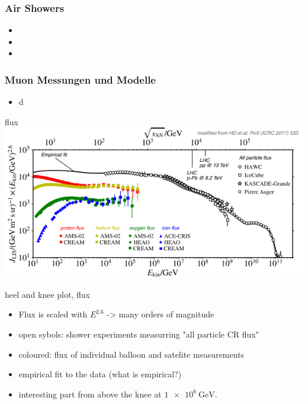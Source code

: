 \documentclass[aspectratio=1610, 9pt]{beamer}
\begin{document}
\begin{frame}\frametitle{Air Showers}
  \begin{itemize}
    \item
    \item
    \item
  \end{itemize}
\end{frame}

\begin{frame}\frametitle{Muon Messungen und Modelle}
  \begin{itemize}
    \item d
  \end{itemize}
\end{frame}

\begin{frame}{flux}
  \includegraphics[width=\textwidth]{knee_heel.png}
\end{frame}

\begin{frame}{heel and knee plot, flux}
  \begin{itemize}
    \item Flux is scaled with $E^{2.6}$ -> many orders of magnitude
    \item open sybols: shower experiments measurring "all particle CR flux"
    \item coloured: flux of individual balloon and satelite measurements
    \item empirical fit to the data (what is empirical?)
    \item interesting part from above the knee at $\SI{1e6}{\giga\electronvolt}$.
  \end{itemize}
\end{frame}
\end{document}
